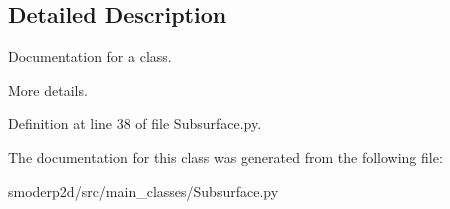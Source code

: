 \subsection{Detailed Description}
Documentation for a class. 

More details. 

Definition at line 38 of file Subsurface.\-py.



The documentation for this class was generated from the following file\-:\begin{DoxyCompactItemize}
\item 
smoderp2d/src/main\-\_\-classes/Subsurface.\-py\end{DoxyCompactItemize}
